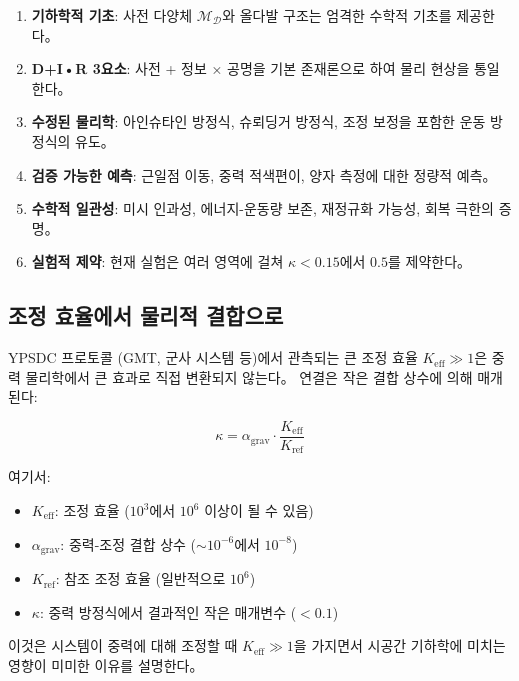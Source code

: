 \documentclass[11pt,a4paper]{article}
\begin{document}
\begin{enumerate}
\item \textbf{기하학적 기초}: 사전 다양체 $\mathcal{M}_{\mathcal{D}}$와 올다발 구조는 엄격한 수학적 기초를 제공한다。

\item \textbf{D+I•R 3요소}: 사전 + 정보 × 공명을 기본 존재론으로 하여 물리 현상을 통일한다。

\item \textbf{수정된 물리학}: 아인슈타인 방정식, 슈뢰딩거 방정식, 조정 보정을 포함한 운동 방정식의 유도。

\item \textbf{검증 가능한 예측}: 근일점 이동, 중력 적색편이, 양자 측정에 대한 정량적 예측。

\item \textbf{수학적 일관성}: 미시 인과성, 에너지-운동량 보존, 재정규화 가능성, 회복 극한의 증명。

\item \textbf{실험적 제약}: 현재 실험은 여러 영역에 걸쳐 $\kappa < 0.15$에서 $0.5$를 제약한다。
\end{enumerate}

\subsection{조정 효율에서 물리적 결합으로}
\label{subsec:keff-to-coupling}

YPSDC 프로토콜 (GMT, 군사 시스템 등)에서 관측되는 큰 조정 효율 $K_{\mathrm{eff}} \gg 1$은 중력 물리학에서 큰 효과로 직접 변환되지 않는다。 연결은 작은 결합 상수에 의해 매개된다:

\begin{equation}
\kappa = \alpha_{\text{grav}} \cdot \frac{K_{\mathrm{eff}}}{K_{\text{ref}}}
\end{equation}

여기서:
\begin{itemize}
\item $K_{\mathrm{eff}}$: 조정 효율 ($10^3$에서 $10^6$ 이상이 될 수 있음)
\item $\alpha_{\text{grav}}$: 중력-조정 결합 상수 ($\sim 10^{-6}$에서 $10^{-8}$)
\item $K_{\text{ref}}$: 참조 조정 효율 (일반적으로 $10^6$)
\item $\kappa$: 중력 방정식에서 결과적인 작은 매개변수 ($< 0.1$)
\end{itemize}

이것은 시스템이 중력에 대해 조정할 때 $K_{\mathrm{eff}} \gg 1$을 가지면서 시공간 기하학에 미치는 영향이 미미한 이유를 설명한다。
\end{document}
